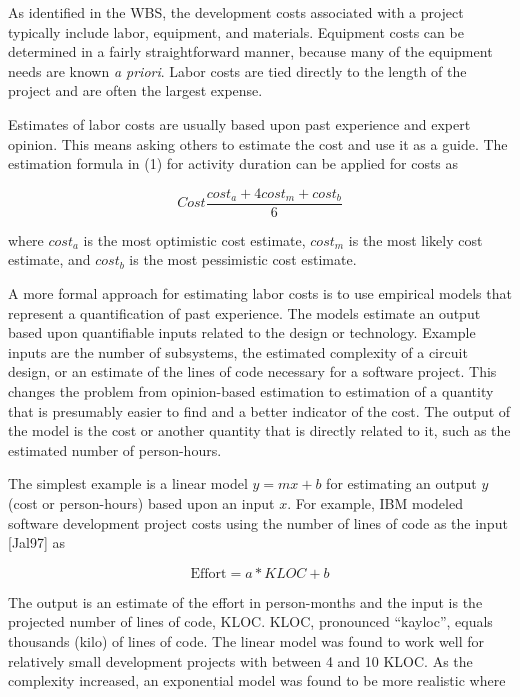 As identified in the WBS, the development costs associated with a
project typically include labor, equipment, and materials. Equipment
costs can be determined in a fairly straightforward manner, because many
of the equipment needs are known \emph{a priori}. Labor costs are tied
directly to the length of the project and are often the largest expense.

Estimates of labor costs are usually based upon past experience and
expert opinion. This means asking others to estimate the cost and use it
as a guide. The estimation formula in (1) for activity duration can be
applied for costs as

\begin{equation}
\label{equ:integralDeltaSliceOfPDF}
Cost \frac{cost_a +4 cost_m + cost_b}{6}
\end{equation}

where $cost_a$ is the most optimistic
cost estimate, $cost_m$ is the most
likely cost estimate, and $cost_b$ is the
most pessimistic cost estimate.

A more formal approach for estimating labor costs is to use empirical
models that represent a quantification of past experience. The models
estimate an output based upon quantifiable inputs related to the design
or technology. Example inputs are the number of subsystems, the
estimated complexity of a circuit design, or an estimate of the lines of
code necessary for a software project. This changes the problem from
opinion-based estimation to estimation of a quantity that is presumably
easier to find and a better indicator of the cost. The output of the
model is the cost or another quantity that is directly related to it,
such as the estimated number of person-hours.

The simplest example is a linear model $y=mx+b$ for estimating an
output $y$ (cost or person-hours) based upon an input $x$. For
example, IBM modeled software development project costs using the number
of lines of code as the input {[}Jal97{]} as

\begin{equation}
\label{equ:softwareEffortIBM}
\text{Effort} = a * KLOC + b
\end{equation}

The output is an estimate of the effort in person-months and the input
is the projected number of lines of code, KLOC. KLOC, pronounced
``kayloc'', equals thousands (kilo) of lines of code. The linear model
was found to work well for relatively small development projects with
between 4 and 10 KLOC. As the complexity increased, an exponential model
was found to be more realistic where

